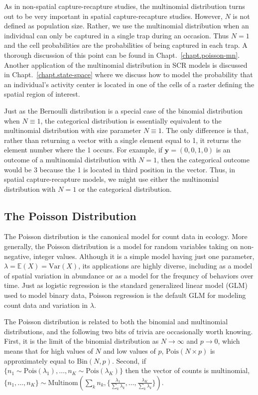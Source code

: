 As in non-spatial capture-recapture studies, the multinomial
distribution turns out to be very important in spatial
capture-recapture studies. However, $N$ is not defined as population
size. Rather, we use the multinomial distribution when an individual
can only be captured in a single trap during an occasion. Thus
$N=1$ and the cell probabilities are the probabilities of
being captured in each trap. A thorough discussion of this point can
be found in Chapt.~\ref{chapt.poisson-mn}. Another application of the
multinomial distribution in SCR models is discussed in
Chapt.~\ref{chapt.state-space} where we discuss how to model the
probability that an individual's activity center is located in one of
the cells of a raster defining the spatial region of interest.

Just as the Bernoulli distribution is a
special case of the binomial distribution when $N \equiv 1$, the
categorical distribution is essentially equivalent to
the multinomial distribution with size parameter
$N\equiv1$. The only difference is that, rather than returning a
vector with a single element equal to 1, it returns the element number
where the 1 occurs. For example, if $\mathbf{y}=(0,0,1,0)$ is an outcome of a
multinomial distribution with $N=1$, then the categorical outcome
would be 3 because the 1 is located in third position in the vector. Thus, in spatial
capture-recapture models, we might use either the multinomial
distribution with $N=1$ or %
the categorical distribution. %


\subsection{The Poisson Distribution}


The Poisson distribution is the canonical model for count data in
ecology.  More generally, the
Poisson distribution is a model for random variables taking on
non-negative, integer values.  Although it is a simple model having just one
parameter, $\lambda = \mathbb{E}(X) = \text{Var}(X)$, its applications
are highly diverse, including
as a model of spatial variation in abundance or as a model for the
frequncy of behaviors over time.  Just as logistic regression is the
standard generalized linear model (GLM) used to model binary data, Poisson
regression is the default GLM for modeling count data and variation in
$\lambda$.

The Poisson distribution is related to
both the binomial and multinomial distributions, and the following two
bits of trivia are occasionally worth knowing. First, it is the limit of the binomial
distribution as $N \to \infty$ and $p \to 0$, which means that for
high values of $N$ and low values
of $p$, $\text{Pois}(N\times p)$ is approximately equal to $\text{Bin}(N,
p)$. Second, if $\{n_1 \sim \text{Pois}(\lambda_1),
\dots, n_K \sim \text{Pois}(\lambda_K)\}$
then the vector of counts is multinomial, $\{n_1, \dots, n_K\}
\sim \text{Multinom}(\sum_k n_k, \{\frac{\lambda_1}{\sum_k \lambda_k},
\dots, \frac{\lambda_K}{\sum_k \lambda_k}
\})$.

